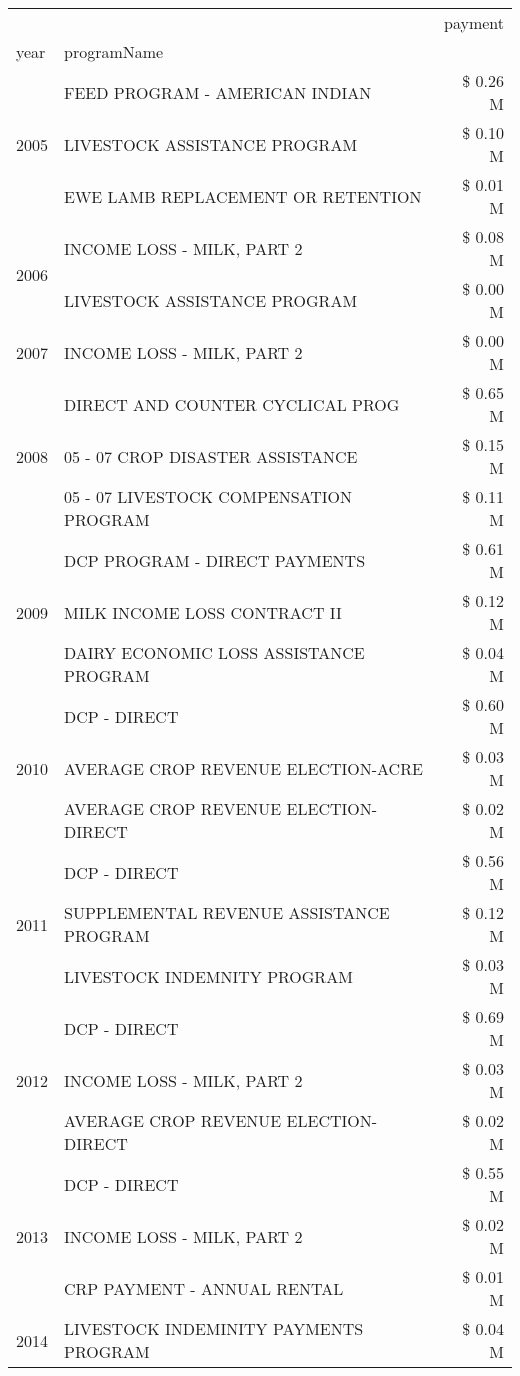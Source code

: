 \begin{tabular}{llr}
\toprule
 &  & payment \\
year & programName &  \\
\midrule
\multirow[t]{3}{*}{2005} & FEED PROGRAM - AMERICAN INDIAN & \$ 0.26 M \\
 & LIVESTOCK ASSISTANCE PROGRAM & \$ 0.10 M \\
 & EWE LAMB REPLACEMENT OR RETENTION & \$ 0.01 M \\
\cline{1-3}
\multirow[t]{2}{*}{2006} & INCOME LOSS - MILK, PART 2 & \$ 0.08 M \\
 & LIVESTOCK ASSISTANCE PROGRAM & \$ 0.00 M \\
\cline{1-3}
2007 & INCOME LOSS - MILK, PART 2 & \$ 0.00 M \\
\cline{1-3}
\multirow[t]{3}{*}{2008} & DIRECT AND COUNTER CYCLICAL PROG & \$ 0.65 M \\
 & 05 - 07 CROP DISASTER ASSISTANCE & \$ 0.15 M \\
 & 05 - 07 LIVESTOCK COMPENSATION PROGRAM & \$ 0.11 M \\
\cline{1-3}
\multirow[t]{3}{*}{2009} & DCP PROGRAM - DIRECT PAYMENTS & \$ 0.61 M \\
 & MILK INCOME LOSS CONTRACT II & \$ 0.12 M \\
 & DAIRY ECONOMIC LOSS ASSISTANCE PROGRAM & \$ 0.04 M \\
\cline{1-3}
\multirow[t]{3}{*}{2010} & DCP - DIRECT & \$ 0.60 M \\
 & AVERAGE CROP REVENUE ELECTION-ACRE & \$ 0.03 M \\
 & AVERAGE CROP REVENUE ELECTION-DIRECT & \$ 0.02 M \\
\cline{1-3}
\multirow[t]{3}{*}{2011} & DCP - DIRECT & \$ 0.56 M \\
 & SUPPLEMENTAL REVENUE ASSISTANCE PROGRAM & \$ 0.12 M \\
 & LIVESTOCK INDEMNITY PROGRAM & \$ 0.03 M \\
\cline{1-3}
\multirow[t]{3}{*}{2012} & DCP - DIRECT & \$ 0.69 M \\
 & INCOME LOSS - MILK, PART 2 & \$ 0.03 M \\
 & AVERAGE CROP REVENUE ELECTION-DIRECT & \$ 0.02 M \\
\cline{1-3}
\multirow[t]{3}{*}{2013} & DCP - DIRECT & \$ 0.55 M \\
 & INCOME LOSS - MILK, PART 2 & \$ 0.02 M \\
 & CRP PAYMENT - ANNUAL RENTAL & \$ 0.01 M \\
\cline{1-3}
\multirow[t]{3}{*}{2014} & LIVESTOCK INDEMINITY PAYMENTS PROGRAM & \$ 0.04 M \\

\end{tabular}
